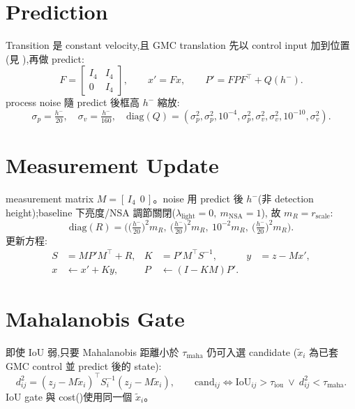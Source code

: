 \section{Prediction}\label{sec:kf-predict}
Transition 是 constant velocity,且 GMC translation 先以 control input 加到位置
(見 ),再做 predict:
\begin{equation}\label{eq:kf-predict}
  F=\begin{bmatrix}I_4 & I_4\\ 0 & I_4\end{bmatrix},\qquad
  x'=Fx,\qquad P'=FPF^{\!\top}+Q(h^-).
\end{equation}
process noise 隨 predict 後框高 \(h^-\) 縮放:
\begin{equation}\label{eq:kf-Q}
  \sigma_p=\tfrac{h^-}{20},\quad \sigma_v=\tfrac{h^-}{160},\quad
  \mathrm{diag}(Q)=(\sigma_p^2,\sigma_p^2,10^{-4},\sigma_p^2,
                    \sigma_v^2,\sigma_v^2,10^{-10},\sigma_v^2).
\end{equation}

\section{Measurement Update}\label{sec:kf-update}
measurement matrix \(M=[\,I_4\ \ 0\,]\)。noise 用 predict 後 \(h^-\)(非 detection
height);baseline 下亮度/NSA 調節關閉(\(\lambda_{\mathrm{light}}{=}0,\ m_{\mathrm{NSA}}{=}1\)),
故 \(m_R=r_{\mathrm{scale}}\):
\begin{equation}\label{eq:kf-R}
  \mathrm{diag}(R)=\Big(\big(\tfrac{h^-}{20}\big)^2 m_R,\ \big(\tfrac{h^-}{20}\big)^2 m_R,\
                      10^{-2}m_R,\ \big(\tfrac{h^-}{20}\big)^2 m_R\Big).
\end{equation}
更新方程:
\begin{equation}\label{eq:kf-kalman}
\begin{aligned}
  S&=MP'M^{\!\top}+R, & K&=P'M^{\!\top}S^{-1}, & y&=z-Mx',\\
  x&\leftarrow x'+Ky, & P&\leftarrow(I-KM)P'.
\end{aligned}
\end{equation}

\section{Mahalanobis Gate}\label{sec:kf-gate}
即使 IoU 弱,只要 Mahalanobis 距離小於 \(\tau_{\mathrm{maha}}\) 仍可入選 candidate
(\(\tilde{x}_i\) 為已套 GMC control 並 predict 後的 state):
\begin{equation}\label{eq:kf-maha}
  d^2_{ij}=(z_j-M\tilde{x}_i)^{\!\top}S_i^{-1}(z_j-M\tilde{x}_i),\qquad
  \mathrm{cand}_{ij}\iff \mathrm{IoU}_{ij}>\tau_{\mathrm{iou}}\ \lor\ d^2_{ij}<\tau_{\mathrm{maha}}.
\end{equation}
IoU gate 與 cost()使用同一個 \(\tilde{x}_i\)。

